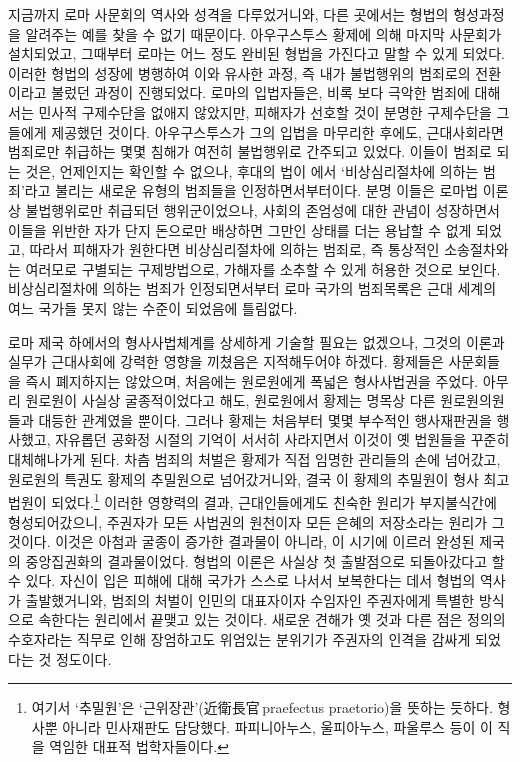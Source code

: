 지금까지 로마 사문회의 역사와 성격을 다루었거니와,
다른 곳에서는 형법의 형성과정을 알려주는 예를 찾을 수 없기 때문이다.
아우구스투스 황제에 의해
마지막 사문회가 설치되었고,
그때부터 로마는 어느 정도 완비된 형법을 가진다고 말할 수 있게 되었다.
이러한 형법의 성장에 병행하여
이와 유사한 과정, 즉
내가 불법행위의 범죄로의 전환이라고 불렀던 과정이 진행되었다.
로마의 입법자들은,
비록 보다 극악한 범죄에 대해서는
민사적 구제수단을 없애지 않았지만,
피해자가 선호할 것이 분명한 구제수단을 그들에게 제공했던 것이다.
아우구스투스가 그의 입법을 마무리한 후에도,
근대사회라면 범죄로만 취급하는
몇몇 침해가 여전히 불법행위로 간주되고 있었다.
이들이 범죄로 되는 것은,
언제인지는 확인할 수 없으나, 후대의
법이 에서
`비상심리절차에 의하는 범죄'라고
불리는 새로운 유형의 범죄들을 인정하면서부터이다.
분명
이들은
로마법 이론상 불법행위로만 취급되던 행위군이었으나,
사회의 존엄성에 대한 관념이 성장하면서
이들을 위반한 자가 단지 돈으로만 배상하면 그만인 상태를
더는 용납할 수 없게 되었고,
따라서 피해자가 원한다면
비상심리절차에 의하는 범죄로,
즉 통상적인 소송절차와는 여러모로 구별되는 구제방법으로,
가해자를 소추할 수 있게 허용한 것으로 보인다.
비상심리절차에 의하는 범죄가 인정되면서부터
로마 국가의 범죄목록은 근대 세계의 여느 국가들 못지 않는 수준이
되었음에 틀림없다.

로마 제국 하에서의 형사사법체계를
상세하게 기술할 필요는 없겠으나,
그것의 이론과 실무가 근대사회에 강력한 영향을 끼쳤음은
지적해두어야 하겠다.
황제들은
사문회들을 즉시 폐지하지는 않았으며,
처음에는
원로원에게
폭넓은 형사사법권을
주었다.
아무리
원로원이
사실상 굴종적이었다고 해도,
원로원에서 황제는
명목상
다른 원로원의원들과 대등한 관계였을 뿐이다.
그러나
황제는
처음부터
몇몇 부수적인 행사재판권을 행사했고,
자유롭던 공화정 시절의 기억이 서서히 사라지면서
이것이 옛 법원들을 꾸준히 대체해나가게 된다.
차츰
범죄의 처벌은
황제가 직접 임명한 관리들의 손에 넘어갔고,
원로원의 특권도 황제의 추밀원으로 넘어갔거니와,
결국 이 황제의 추밀원이 형사 최고법원이 되었다.\footnote{%
  여기서 `추밀원'은 `근위장관'(近衛長官\,praefectus praetorio)을
  뜻하는 듯하다. 형사뿐 아니라 민사재판도 담당했다.
  파피니아누스, 울피아누스, 파울루스 등이 이 직을 역임한 대표적 법학자들이다.}
이러한 영향력의 결과,
근대인들에게도 친숙한 원리가 부지불식간에 형성되어갔으니,
주권자가 모든 사법권의 원천이자 모든 은혜의 저장소라는 원리가 그것이다.
이것은 아첨과 굴종이 증가한 결과물이 아니라,
이 시기에 이르러 완성된 제국의 중앙집권화의 결과물이었다.
형법의 이론은 사실상 첫 출발점으로 되돌아갔다고 할 수 있다.
자신이 입은 피해에 대해 국가가 스스로 나서서 보복한다는 데서
형법의 역사가 출발했거니와,
범죄의 처벌이
인민의 대표자이자 수임자인 주권자에게
특별한 방식으로 속한다는 원리에서 끝맺고 있는 것이다.
새로운 견해가 옛 것과 다른 점은
정의의 수호자라는 직무로 인해
장엄하고도 위엄있는 분위기가
주권자의 인격을 감싸게 되었다는 것 정도이다.

